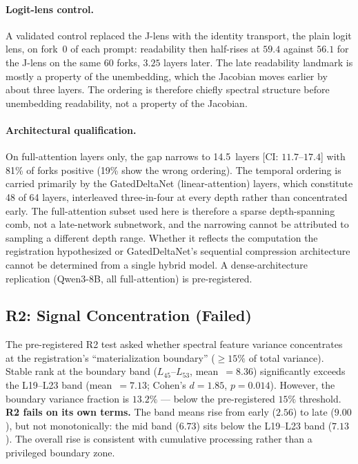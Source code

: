 \documentclass[11pt,a4paper]{article}
\begin{document}
\paragraph{Logit-lens control.} A validated control replaced the J-lens
with the identity transport, the plain logit lens, on fork~0 of each
prompt: readability then half-rises at $59.4$ against $56.1$ for the J-lens on the same 60 forks, $3.25$ layers later. The late readability landmark is
mostly a property of the unembedding, which the Jacobian moves earlier by
about three layers. The ordering is therefore chiefly spectral structure
before unembedding readability, not a property of the Jacobian.

\paragraph{Architectural qualification.} On full-attention layers only,
the gap narrows to 14.5~layers [CI: $11.7$--$17.4$] with 81\% of
forks positive (19\% show the wrong ordering). The temporal ordering
is carried primarily by the GatedDeltaNet (linear-attention) layers,
which constitute 48 of 64 layers, interleaved three-in-four at every
depth rather than concentrated early. The full-attention subset used
here is therefore a sparse depth-spanning comb,
not a late-network subnetwork, and the narrowing cannot be attributed
to sampling a different depth range. Whether it reflects the computation the registration hypothesized or
GatedDeltaNet's sequential compression architecture
cannot be determined from a single hybrid model. A dense-architecture
replication (Qwen3-8B, all full-attention) is pre-registered.

\subsection{R2: Signal Concentration (Failed)}

The pre-registered R2 test asked whether spectral feature variance
concentrates at the registration's ``materialization boundary''
(${\geq}15\%$ of total
variance). Stable rank at the boundary band ($L_{45}$--$L_{53}$,
mean~$= 8.36$) significantly exceeds the L19--L23 band
(mean~$= 7.13$; Cohen's $d{=}1.85$,
$p{=}0.014$). However, the boundary variance fraction is $13.2\%$
--- below the pre-registered $15\%$ threshold. \textbf{R2 fails on its
own terms.} The band means rise from early ($2.56$) to late ($9.00$),
but not monotonically: the mid band ($6.73$) sits below the L19--L23 band ($7.13$). The overall rise is consistent with cumulative processing rather
than a privileged boundary zone.
\end{document}
